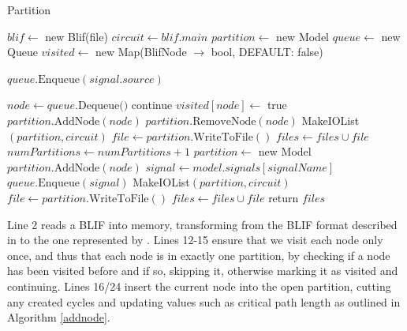\documentclass[12pt,final,oneside]{dwThesis} %
\begin{document}
   \begin{algorithm}
      \caption{Partition}\label{partition}
      \begin{algorithmic}[1]
         \State $blif \gets$ new Blif(file) 
         \State $circuit \gets blif.main$ 
         \State $partition \gets$ new Model 
         \State $queue \gets$ new Queue 
         \State $visited \gets$ new Map(BlifNode $\to$ bool, DEFAULT: false)

         \State $queue.\mbox{Enqueue}(signal.source)$
         \EndFor

         \State $node \gets queue.\mbox{Dequeue()}$
         \State continue 
         \EndIf
         \State $visited[node] \gets $ true
         \State $partition.\mbox{AddNode}(node)$
         \State $partition.\mbox{RemoveNode}(node)$
         \State MakeIOList$(partition, circuit)$
         \State $file \gets partition.\mbox{WriteToFile}()$
         \State $files \gets files\cup file$
         \State $numPartitions \gets numPartitions+1$
         \State $partition \gets$ new Model 
         \State $partition.\mbox{AddNode}(node)$
         \EndIf
         \State $signal \gets model.signals[signalName]$
         \State $queue.\mbox{Enqueue}(signal)$
         \EndFor
         \EndWhile
         \State MakeIOList$(partition, circuit)$
         \State $file \gets partition.\mbox{WriteToFile}()$
         \State $files \gets files\cup file$
         \EndIf
         \State return $files$
         \EndProcedure
      \end{algorithmic}
   \end{algorithm}
   \FloatBarrier
   Line 2 reads a \gls{BLIF} into memory, transforming from the \gls{BLIF} format described in  to the one represented by .
   Lines 12-15 ensure that we visit each node only once, and thus that each node is in exactly one partition, by checking if a node has been visited before and if so, skipping it, otherwise marking it as visited and continuing.
   Lines 16/24 insert the current node into the open partition, cutting any created cycles and updating values such as critical path length as outlined in Algorithm \ref{addnode}.
\end{document}
